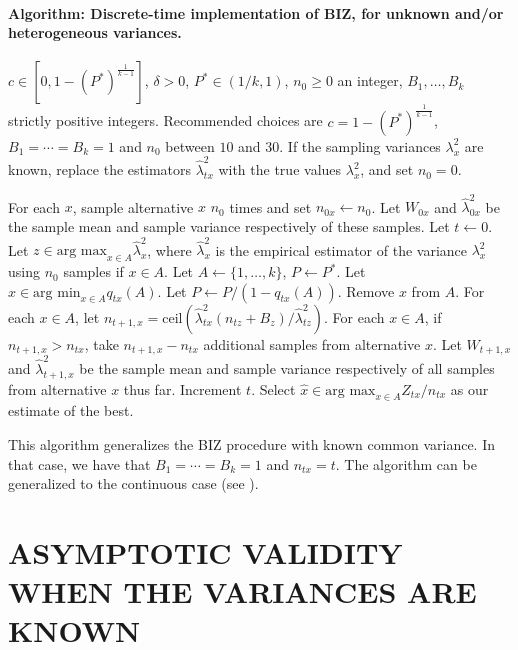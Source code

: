 \documentclass{wscpaperproc}
\newcommand{\lambdahat}{\widehat{\lambda}}
\newcommand{\xhat}{\hat{x}}
\newcommand{\upthresh}{P}
\newcommand{\cmax}{1-(P^*)^{\frac1{k-1}}}
\newcommand{\ceil}{\mathrm{ceil}}
\theoremstyle{wsc}
\begin{document}
\paragraph{Algorithm: Discrete-time implementation of BIZ, for unknown and/or heterogeneous variances.}    
\begin{algorithmic}[1]   
\label{alg:hetero-BIZ}   
\REQUIRE $c \in [0,\cmax]$, $\delta>0$, $P^*\in(1/k,1)$, $n_0\ge0$ an integer, $B_1,\ldots,B_k$ strictly positive integers.  Recommended choices are $c=\cmax$, $B_1=\cdots=B_k=1$ and $n_0$ between $10$ and $30$.     If the sampling variances $\lambda^2_x$ are known, replace the estimators     
$\lambdahat^2_{tx}$ with the true values $\lambda^2_x$, and set $n_0=0$.     

\STATE For each $x$, sample alternative $x$ $n_0$ times and set $n_{0x} \leftarrow n_0$.     
Let $W_{0x}$ and $\lambdahat^2_{0x}$ be the sample mean and sample variance respectively of these samples.     Let $t\leftarrow 0$. Let $z \in \mbox{arg max}_{x\in A} \lambdahat^2_{x}$, where $\lambdahat^2_{x}$ is the empirical estimator of the variance $\lambda^2_x$ using $n_0$ samples if $x\in A$.    
\STATE Let $A \leftarrow \{ 1,\ldots, k\}$, $\upthresh \leftarrow P^*$.
 \STATE Let $x\in\mbox{arg min}_{x\in A} q_{tx}\left(A\right)$.
    \STATE Let $\upthresh \leftarrow \upthresh/(1-q_{tx}\left(A\right))$.     
\STATE Remove $x$ from $A$.
\ENDWHILE    
\STATE For each $x\in A$, let      $n_{t+1,x} = \ceil\left( \lambdahat^2_{tx} (n_{tz} + B_z) / \lambdahat^2_{tz} \right)$.     \STATE For each $x\in A$, if $n_{t+1,x}>n_{tx}$, take $n_{t+1,x}-n_{tx}$ additional samples from alternative $x$.  Let $W_{t+1,x}$ and $\lambdahat^2_{t+1,x}$ be the sample mean and sample variance respectively of all samples from alternative $x$ thus far.    
\STATE Increment $t$.
 \ENDWHILE
  \STATE Select $\xhat \in\mbox{arg max}_{x\in A} Z_{tx} / n_{tx}$ as our estimate of the best.

   
\end{algorithmic} 
\hspace{5 mm}

This algorithm generalizes the BIZ procedure with known common variance. In that case, we have that $B_1=\cdots=B_k=1$ and $n_{tx}=t$. The algorithm can be generalized to the continuous case (see  ). 

\section{ASYMPTOTIC VALIDITY WHEN THE VARIANCES ARE KNOWN}
\end{document}
